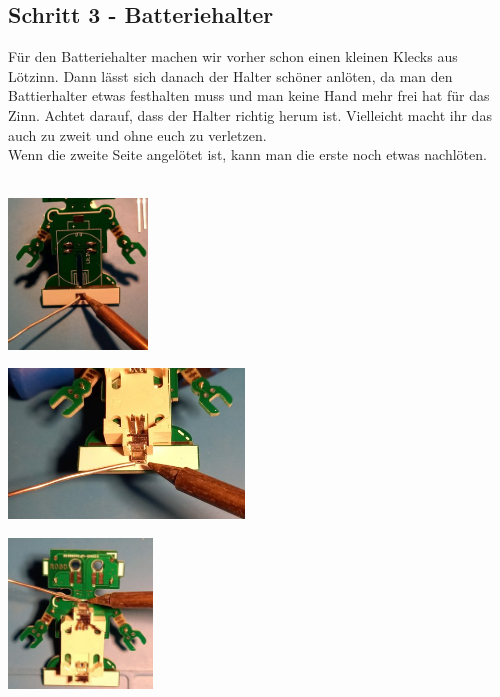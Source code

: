 \documentclass[a4paper]{article}
\begin{document}
\subsection{Schritt 3 - Batteriehalter}
Für den Batteriehalter machen wir vorher schon einen kleinen Klecks aus Lötzinn. Dann lässt sich danach der Halter schöner anlöten, da man den Battierhalter etwas festhalten muss und man keine Hand mehr frei hat für das Zinn. Achtet darauf, dass der Halter richtig herum ist. Vielleicht macht ihr das auch zu zweit und ohne euch zu verletzen.\\
Wenn die zweite Seite angelötet ist, kann man die erste noch etwas nachlöten.\\
\ \\
\begin{minipage}[t]{0.33\textwidth}
  \centering
  \includegraphics[height=4cm]{../pictures/Bat1.jpg}
  \label{img:Bat1}
  \end{minipage}
\begin{minipage}[t]{0.33\textwidth}
  \centering
  \includegraphics[height=4cm]{../pictures/Bat2.jpg}
  \label{img:Bat2}
\end{minipage}
\begin{minipage}[t]{0.33\textwidth}
  \centering
  \includegraphics[height=4cm]{../pictures/Bat3.jpg}
  \label{img:Bat3}
\end{minipage}
\end{document}

